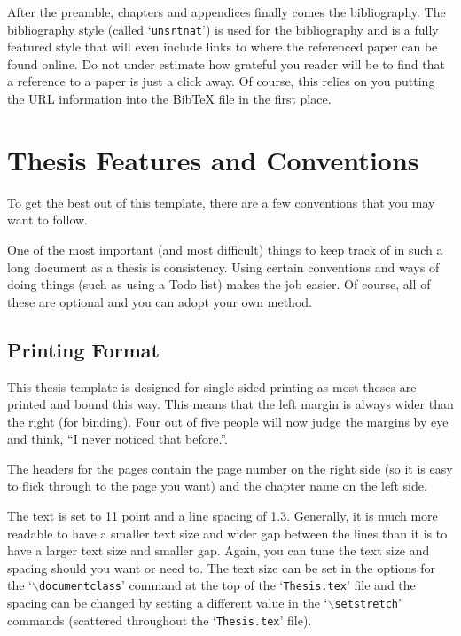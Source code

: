 After the preamble, chapters and appendices finally comes the bibliography. The bibliography style (called `\texttt{unsrtnat}') is used for the bibliography and is a fully featured style that will even include links to where the referenced paper can be found online. Do not under estimate how grateful you reader will be to find that a reference to a paper is just a click away. Of course, this relies on you putting the URL information into the BibTeX file in the first place.


\section{Thesis Features and Conventions}\label{ThesisConventions}

To get the best out of this template, there are a few conventions that you may want to follow.

One of the most important (and most difficult) things to keep track of in such a long document as a thesis is consistency. Using certain conventions and ways of doing things (such as using a Todo list) makes the job easier. Of course, all of these are optional and you can adopt your own method.

\subsection{Printing Format}

This thesis template is designed for single sided printing as most theses are printed and bound this way. This means that the left margin is always wider than the right (for binding). Four out of five people will now judge the margins by eye and think, ``I never 
noticed that before.''.

The headers for the pages contain the page number on the right side (so it is easy to flick through to the page you want) and the chapter name on the left side.

The text is set to 11 point and a line spacing of 1.3. Generally, it is much more readable to have a smaller text size and wider gap between the lines than it is to have a larger text size and smaller gap. Again, you can tune the text size and spacing should you want or need to. The text size can be set in the options for the `$\backslash$\texttt{documentclass}' command at the top of the `\texttt{Thesis.tex}' file and the spacing can be changed by setting a different value in the `$\backslash$\texttt{setstretch}' commands (scattered throughout the `\texttt{Thesis.tex}' file).


